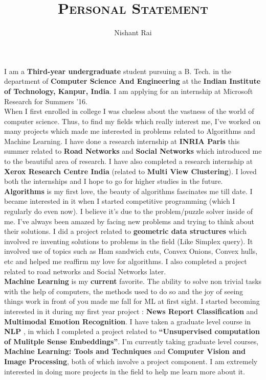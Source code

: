\documentclass[a4paper]{article}
\title{\huge{\textsc{Personal Statement}}}
\author{Nishant Rai}
\date{}
\begin{document}
	\maketitle	
	
	I am a \textbf{Third-year undergraduate} student pursuing a B. Tech. in the department of \textbf{Computer Science And Engineering} at the \textbf{Indian Institute of Technology, Kanpur, India}. I am applying for an internship at Microsoft Research for Summers '16.\\

When I first enrolled in college I was clueless about the vastness of the world of computer science. Thus, to find my fields which really interest me, I've worked on many projects which made me interested in problems related to Algorithms and Machine Learning. I have done a research internship at \textbf{INRIA Paris} this summer related to \textbf{Road Networks} and \textbf{Social Networks} which introduced me to the beautiful area of research. I have also completed a research internship at \textbf{Xerox Research Centre India} (related to \textbf{Multi View Clustering}). I loved both the internships and I hope to go for higher studies in the future.\\

\textbf{Algorithms} is my first love, the beauty of algorithms fascinates me till date. I became interested in it when I started competitive programming (which I regularly do even now). I believe it's due to the problem/puzzle solver inside of me. I've always been amazed by facing new problems and trying to think about their solutions. I did a project related to \textbf{geometric data structures} which involved re inventing solutions to problems in the field (Like Simplex query). It involved use of topics such as Ham sandwich cuts, Convex Onions, Convex hulls, etc and helped me reaffirm my love for algorithms. I also completed a project related to road networks and Social Networks later.\\

\textbf{Machine Learning} is my \textbf{current} favorite. The ability to solve non trivial tasks with the help of computers, the methods used to do so and the joy of seeing things work in front of you made me fall for ML at first sight. I started becoming interested in it during my first year project : \textbf{News Report Classification} and \textbf{Multimodal Emotion Recognition}. I have taken a graduate level course in \textbf{NLP} , in which I completed a project related to \textbf{“Unsupervised computation of Mulitple Sense Embeddings”}. I'm currently taking graduate level courses, \textbf{Machine Learning: Tools and Techniques} and \textbf{Computer Vision and Image Processing}, both of which involve a project component. I am extremely interested in doing more projects in the field to help me learn more about it.\\
\end{document}
